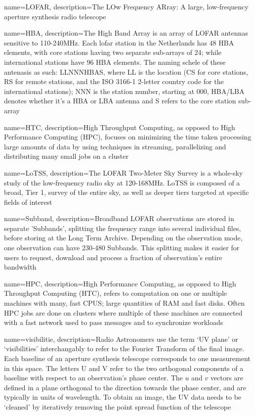 
\makeglossaries

{
    name=LOFAR,
    description={The LOw Frequency ARray: A large, low-frequency aperture synthesis radio telescope} 
}

{
    name=HBA,
    description={The High Band Array is an array of LOFAR antennas sensitive to 110-240MHz. Each lofar station in the Netherlands has 48 HBA elements, with core stations having two separate sub-arrays of 24; while international stations have 96 HBA elements. The naming schele of these antenasis as such: LLNNNHBAS, where LL is the location (CS for core stations, RS for remote stations, and the ISO 3166-1 2-letter country code for the international stations); NNN is the station number, starting at 000, HBA/LBA denotes whether it's a HBA or LBA antenna and S refers to the core station sub-array}
}

{
    name=HTC,
    description={High Throughput Computing, as opposed to High Performance Computing (\Gls{HPC}), focuses on minimizing the time taken processing large amounts of data by using techniques in streaming, parallelizing and distributing many small jobs on a cluster }
}


{
    name=LoTSS,
    description={The LOFAR Two-Meter Sky Survey is a whole-sky study of the low-frequency radio sky at 120-168MHz. LoTSS is composed of a broad, Tier 1, survey of the entire sky, as well as deeper tiers targeted at specific fields of interest }
}


{
    name=Subband,
    description={Broadband LOFAR observations are stored in separate 'Subbands', splitting the frequency range into several individual files, before storing at the Long Term Archive. Depending on the observation mode, one observation can have 230-480 Subbands. This splitting makes it easier for users to request, download and process a fraction of observation's entire bandwidth}
}

{
    name=HPC,
    description={High Performance Computing, as opposed to High Throughput Computing (\Gls{HTC}), refers to computation on one or multiple machines with many, fast CPUS; large quantities of RAM and fast disks. Often HPC jobs are done on clusters where multiple of these machines are connected with a fast network used to pass messages and to synchronize workloads 
}}

{
    name={visibilitie},
    description={Radio Astronomers use the term `UV plane' or `visibilities' interchangably to refer to the Fourier Transform of the final image. Each baseline of an aperture synthesis telescope corresponds to one measurement in this space. The letters U and V refer to the two  orthogonal components of a baseline with respect to an observation's phase center. The $u$ and $v$ vectors are defined in a plane orthogonal to the direction towards the phase center, and are typically in units of wavelength. To obtain an image, the UV data needs to be `cleaned' by iteratively removing the point spread function of the telescope}
}

